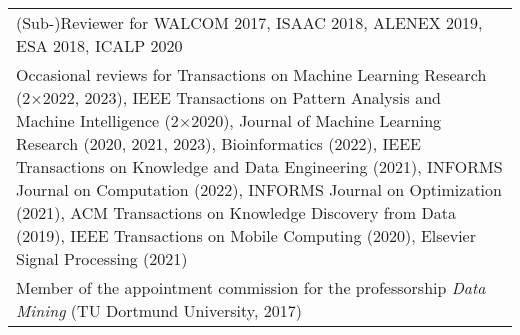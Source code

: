 \documentclass[11pt, a4paper, DIV=14, headings=small]{scrartcl}
\begin{document}
\begin{longtabu}{p{14.5cm}}
		
		(Sub-)Reviewer for WALCOM 2017, ISAAC 2018, ALENEX 2019, ESA 2018, ICALP 2020                                                                                                                                                                                                                                                                                                                                                                                                                                                                                                                                                                                                                                                                                                                                                                                                                 \\[2em]
		
		Occasional reviews for Transactions on Machine Learning Research (2$\times$2022, 2023), IEEE Transactions on Pattern Analysis and Machine Intelligence (2$\times$2020), Journal of Machine Learning Research (2020, 2021, 2023), Bioinformatics (2022), IEEE Transactions on Knowledge and Data Engineering (2021), INFORMS Journal on Computation (2022), INFORMS Journal on Optimization (2021), ACM Transactions on Knowledge Discovery from Data (2019), IEEE Transactions on Mobile Computing (2020), Elsevier Signal Processing (2021)                                                                                                                                                                                                                                                                                                                                                                         \\[7em]
		
		Member of the appointment commission for the professorship \emph{Data Mining} (TU Dortmund University, 2017)
	\end{longtabu}
	
\end{document}
